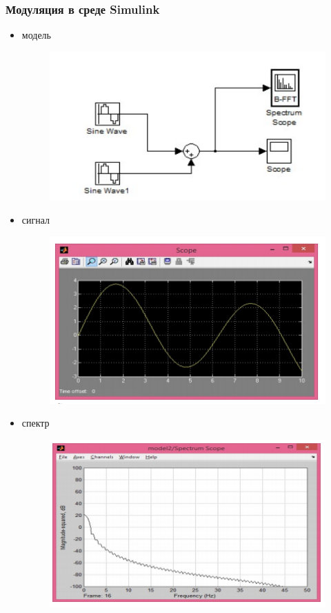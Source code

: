 \documentclass[10pt,a4paper]{article}
\begin{document}
\subsubsection{Модуляция в среде Simulink}
\begin{itemize}
\item модель
\begin{figure}[h]
\centering
\includegraphics[width=12cm]{sim5_1.png} 
\end{figure}
\item сигнал
\begin{figure}[h]
\centering
\includegraphics[width=12cm]{sim5_2.png} 
\end{figure}
\item спектр
\begin{figure}[h]
\centering
\includegraphics[width=12cm]{sim5_3.png} 
\end{figure}
\end{itemize}
\FloatBarrier
\end{document}
